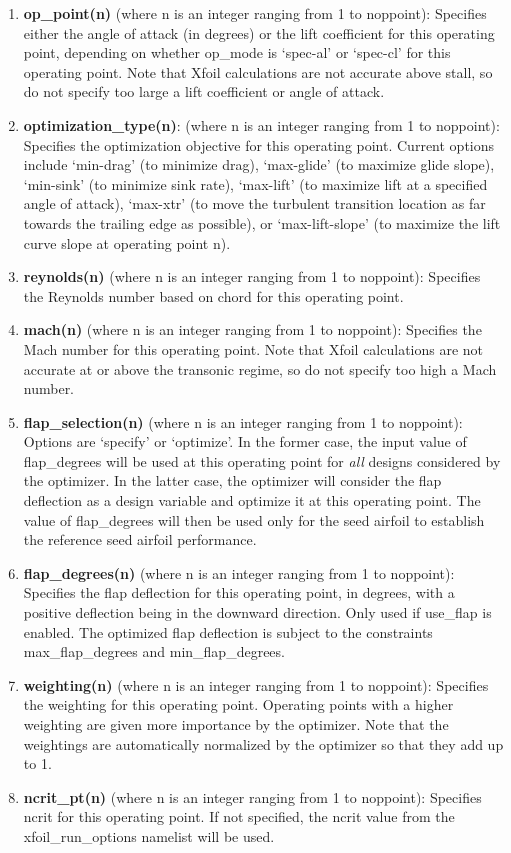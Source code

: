 \documentclass[11pt]{article}
\begin{document}
\begin{enumerate}
{coefficient is known as a function of the aircraft weight and flight speed during design.}
\item{\textbf{op\_point(n)} (where n is an integer ranging from 1 to noppoint):
Specifies either the angle of attack (in degrees) or the lift coefficient for this
operating point, depending on whether op\_mode is `spec-al' or `spec-cl' for this
operating point.  Note that Xfoil calculations are not accurate above stall, so do not
specify too large a lift coefficient or angle of attack.}
\item{\textbf{optimization\_type(n)}: (where n is an integer ranging from 1 to
noppoint): Specifies the optimization objective for this operating point. Current options 
include `min-drag' (to minimize drag), `max-glide' (to maximize 
glide slope), `min-sink' (to minimize sink rate), `max-lift' (to maximize lift at a
specified angle of attack), `max-xtr' (to move the turbulent transition location as far
towards the trailing edge as possible), or `max-lift-slope' (to maximize the lift curve
slope at operating point n).}
\item{\textbf{reynolds(n)} (where n is an integer ranging from 1 to noppoint): Specifies
the Reynolds number based on chord for this operating point.}
\item{\textbf{mach(n)} (where n is an integer ranging from 1 to noppoint): Specifies
the Mach number for this operating point.  Note that Xfoil calculations are not accurate
at or above the transonic regime, so do not specify too high a Mach number.}
\item{\textbf{flap\_selection(n)} (where n is an integer ranging from 1 to noppoint):
Options are `specify' or `optimize'.  In the former case, the input value of flap\_degrees
will be used at this operating point for \textit{all} designs considered by the optimizer.
In the latter case, the optimizer will consider the flap deflection as a design variable
and optimize it at this operating point.  The value of flap\_degrees will then be used
only for the seed airfoil to establish the reference seed airfoil performance.}
\item{\textbf{flap\_degrees(n)} (where n is an integer ranging from 1 to noppoint):
Specifies the flap deflection for this operating point, in degrees, with a positive
deflection being in the downward direction. Only used if use\_flap is enabled. The
optimized flap deflection is subject to the constraints max\_flap\_degrees and
min\_flap\_degrees.}
\item{\textbf{weighting(n)} (where n is an integer ranging from 1 to noppoint): Specifies
the weighting for this operating point.  Operating points with a higher weighting are
given more importance by the optimizer.  Note that the weightings are automatically 
normalized by the optimizer so that they add up to 1.}
\item{\textbf{ncrit\_pt(n)} (where n is an integer ranging from 1 to noppoint): Specifies
ncrit for this operating point. If not specified, the ncrit value from the
xfoil\_run\_options namelist will be used.}
\end{enumerate}
\end{document}

